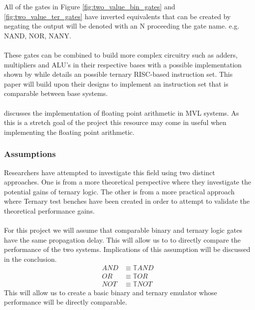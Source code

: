 \documentclass[12pt]{article}
\begin{document}
All of the gates in Figure \ref{fig:two_value_bin_gates} and \ref{fig:two_value_ter_gates} have inverted equivalents that can be
created by negating the output will be denoted with an N proceeding the gate name. e.g. NAND, NOR, NANY.\\
\\
These gates can be combined to build more complex circuitry such as adders, multipliers and ALU's in their respective bases with 
a possible implementation shown by \citep{keshavarzian2014novel} while \citep{kam2022design} details an possible ternary RISC-based 
instruction set. This paper will build upon their designs to implement an instruction set that is comparable between base systems.\\
\\
\citep{clarke1993implementation} discusses the implementation of floating point arithmetic in MVL systems. As this is a stretch goal 
of the project this resource may come in useful when implementing the floating point arithmetic.\\

\subsubsection{Assumptions}

Researchers have attempted to investigate this field using two distinct approaches. One is from a more theoretical perspective
where they investigate the potential gains of ternary logic. The other is from a more practical approach where 
Ternary test benches have been created in order to attempt to validate the theoretical performance gains.\\
\\
For this project we will assume that comparable binary and ternary logic gates have the same propagation delay. This will allow us to
to directly compare the performance of the two systems. Implications of this assumption will be discussed in the conclusion.
\begin{equation}
    \begin{aligned}
        AND &\equiv \mathbb{T}AND \\
        OR &\equiv \mathbb{T}OR \\
  NOT &\equiv \mathbb{T}NOT
\end{aligned}
\end{equation}
This will allow us to create a basic binary and ternary emulator whose performance will be directly comparable.
\end{document}
